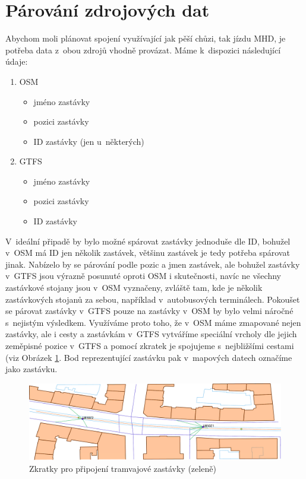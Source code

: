 \section{Párování zdrojových dat}
Abychom moli plánovat spojení využívající jak pěší chůzi, tak jízdu MHD, je
potřeba data z~obou zdrojů vhodně provázat. Máme k~dispozici následující údaje:
\begin{enumerate}
\item OSM
\begin{itemize}
	\item jméno zastávky
	\item pozici zastávky
	\item ID zastávky (jen u~některých)
\end{itemize}
\item GTFS
\begin{itemize}
	\item jméno zastávky
	\item pozici zastávky
	\item ID zastávky
\end{itemize}
\end{enumerate} 
V~ideální připadě by bylo možné spárovat zastávky jednoduše dle ID, bohužel
v~OSM má ID jen několik zastávek, většinu zastávek je tedy potřeba spárovat jinak.
Nabízelo by se párování podle pozic a jmen zastávek, ale bohužel zastávky v~GTFS
jsou výrazně posunuté oproti OSM i skutečnosti, navíc ne všechny zastávkové
stojany jsou v~OSM vyznačeny, zvláště tam, kde je několik zastávkových stojanů
za sebou, například v~autobusových terminálech. Pokoušet se párovat zastávky
v~GTFS pouze na zastávky v~OSM by bylo velmi náročné s~nejistým výsledkem.
Využíváme proto toho, že v~OSM máme zmapované nejen zastávky, ale i cesty a
zastávkám v~GTFS vytváříme speciální vrcholy dle jejich zeměpisné pozice v~GTFS
a pomocí zkratek je spojujeme s~nejbližšími cestami (viz Obrázek
\ref{fig:zastavka}. Bod reprezentující zastávku pak v~mapových datech označíme
jako zastávku.

\begin{figure}
  \centering
    \includegraphics[width=\textwidth]{../img/tramvaj.pdf}
  \caption{Zkratky pro připojení tramvajové zastávky (zeleně)}
  \label{fig:zastavka}
\end{figure}


